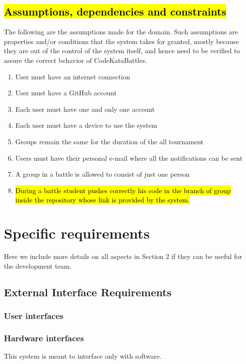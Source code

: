 \documentclass{article}
\begin{document}
    \subsection{\hl{Assumptions, dependencies and constraints}}
    The following are the assumptions made for the domain. Such assumptions are properties and/or conditions that the system takes for granted, mostly because they are out of the control of the system itself, and hence need to be verified to assure the correct behavior of CodeKataBattles.
        \begin{enumerate}[label=\textbf{D\arabic*}:, left=0pt]
            \item User must have an internet connection
            \item User must have a GitHub account
            \item Each user must have one and only one account
            \item Each user must have a device to use the system
            \item Groups remain the same for the duration of the all tournament
            \item Users must have their personal e-mail where all the notifications can be sent
            \item A group in a battle is allowed to consist of just one person
            \item \hl{During a battle student pushes correctly his code in the branch of group inside the repository whose link is provided by the system.}
        \end{enumerate}

\section{Specific requirements}
    Here we include more details on all aspects in Section 2 if they can be useful for the development team.
    \subsection{External Interface Requirements}
        \subsubsection{User interfaces}
        \subsubsection{Hardware interfaces}
            This system is meant to interface only with software.
\end{document}
